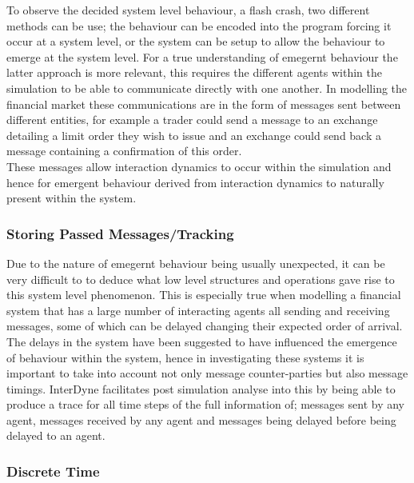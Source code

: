 \documentclass{article}
\begin{document}
To observe the decided system level behaviour, a flash crash, two different methods can be use; the behaviour can be encoded into the program forcing it occur at a system level, or the system can be setup to allow the behaviour to emerge at the system level. For a true understanding of emegernt behaviour the latter approach is more relevant, this requires the different agents within the simulation to be able to communicate directly with one another. In modelling the financial market these communications are in the form of messages sent between different entities, for example a trader could send a message to an exchange detailing a limit order they wish to issue and an exchange could send back a message containing a confirmation of this order.\\
These messages allow interaction dynamics to occur within the simulation and hence for emergent behaviour derived from interaction dynamics to naturally present within the system. 




\subsubsection{Storing Passed Messages/Tracking}

Due to the nature of emegernt behaviour being usually unexpected, it can be very difficult to to deduce what low level structures and operations gave rise to this system level phenomenon. This is especially true when modelling a financial system that has a large number of interacting agents all sending and receiving messages, some of which can be delayed changing their expected order of arrival. The delays in the system have been suggested to have influenced the emergence of behaviour within the system, hence in investigating these systems it is important to take into account not only message counter-parties but also message timings. InterDyne facilitates post simulation analyse into this by being able to produce a trace for all time steps of the full information of; messages sent by any agent, messages received by any agent and messages being delayed before being delayed to an agent.          

  
\subsubsection{Discrete Time}
\end{document}
